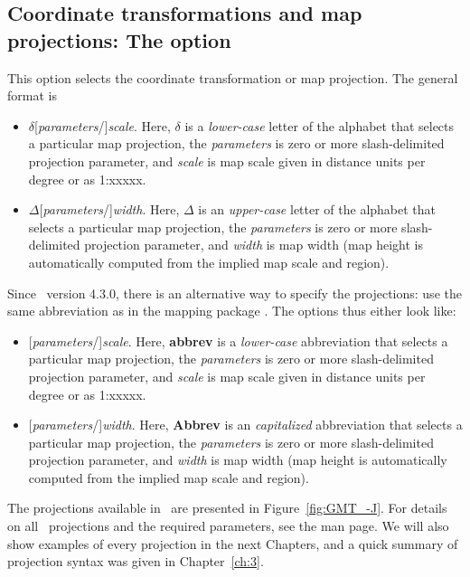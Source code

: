 \subsection{Coordinate transformations and map projections: The  option}

This option selects the coordinate transformation or map projection.  The general format is
\begin{itemize}
\item {}$\delta$[\emph{parameters}/]\emph{scale}.  Here, $\delta$ is a \emph{lower-case}
letter of the alphabet that selects a particular map projection, the \emph{parameters}
is zero or more slash-delimited projection parameter, and \emph{scale} is map scale given in
distance units per degree or as 1:xxxxx.
\item {}$\Delta$[\emph{parameters}/]\emph{width}.  Here, $\Delta$ is an \emph{upper-case}
letter of the alphabet that selects a particular map projection, the \emph{parameters}
is zero or more slash-delimited projection parameter, and \emph{width} is map width (map
height is automatically computed from the implied map scale and region).
\end{itemize}
Since \GMT\ version 4.3.0, there is an alternative way to specify the projections: use the same abbreviation as in the mapping package . The options thus either look like:
\begin{itemize}
\item {}[\emph{parameters}/]\emph{scale}.  Here, \textbf{abbrev} is a \emph{lower-case}
abbreviation that selects a particular map projection, the \emph{parameters}
is zero or more slash-delimited projection parameter, and \emph{scale} is map scale given in
distance units per degree or as 1:xxxxx.
\item {}[\emph{parameters}/]\emph{width}.  Here, \textbf{Abbrev} is an \emph{capitalized} abbreviation that selects a particular map projection, the \emph{parameters}
is zero or more slash-delimited projection parameter, and \emph{width} is map width (map
height is automatically computed from the implied map scale and region).
\end{itemize}


The projections available in \GMT\ are presented in Figure~\ref{fig:GMT_-J}.
For details on all \GMT\ projections and the required parameters, see the  man page.
We will also show examples of every projection in the next Chapters, and a quick
summary of projection syntax was given in Chapter~\ref{ch:3}.

